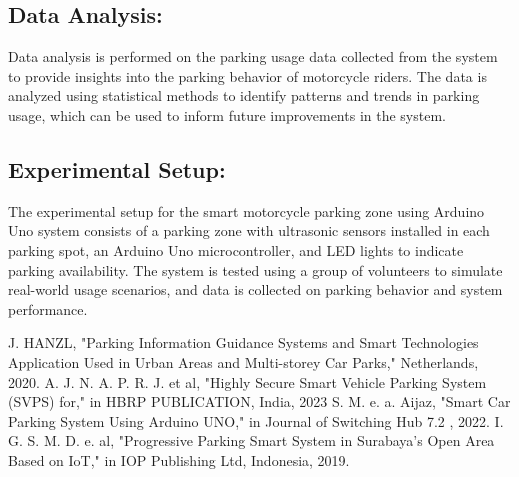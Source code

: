 \documentclass[conference]{IEEEtran}
\begin{document}
	
	\subsection{Data Analysis:}
Data analysis is performed on the parking usage data collected from the system to provide insights into the parking behavior of motorcycle riders. The data is analyzed using statistical methods to identify patterns and trends in parking usage, which can be used to inform future improvements in the system.
	\subsection{Experimental Setup:}
	The experimental setup for the smart motorcycle parking zone using Arduino Uno system consists of a parking zone with ultrasonic sensors installed in each parking spot, an Arduino Uno microcontroller, and LED lights to indicate parking availability. The system is tested using a group of volunteers to simulate real-world usage scenarios, and data is collected on parking behavior and system performance.
	
	
	
	

	
\begin{thebibliography}{00}
J. HANZL, "Parking Information Guidance Systems and Smart Technologies Application Used in Urban Areas and Multi-storey Car Parks," Netherlands, 2020. 
 A. J. N. A. P. R. J. et al, "Highly Secure Smart Vehicle Parking System (SVPS) for," in HBRP PUBLICATION, India, 2023 
 S. M. e. a. Aijaz, "Smart Car Parking System Using Arduino UNO," in Journal of Switching Hub 7.2 , 2022. 
	I. G. S. M. D. e. al, "Progressive Parking Smart System in Surabaya's Open Area Based on IoT," in IOP Publishing Ltd, Indonesia, 2019. 
\end{thebibliography}
\end{document}
